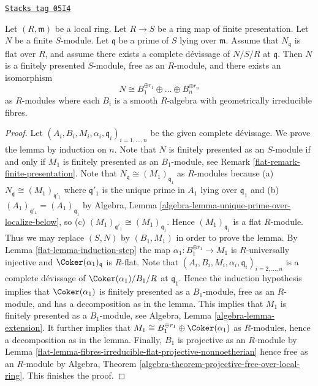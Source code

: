 \begin{lemma}
\label{flat-lemma-complete-devissage-flat-finite-type-module}
\href{https://stacks.math.columbia.edu/tag/05I4}{\texttt{Stacks tag 05I4}}

Let $(R, \mathfrak m)$ be a local ring.
Let $R \to S$ be a ring map of finite presentation.
Let $N$ be a finite $S$-module.
Let $\mathfrak q$ be a prime of $S$ lying over $\mathfrak m$.
Assume that $N_{\mathfrak q}$ is flat over $R$, and
assume there exists a complete d\'evissage of $N/S/R$ at $\mathfrak q$.
Then $N$ is a finitely presented $S$-module, free as an $R$-module,
and there exists an isomorphism
$$
N \cong B_1^{\oplus r_1} \oplus \ldots \oplus B_n^{\oplus r_n}
$$
as $R$-modules where each $B_i$ is a smooth $R$-algebra with geometrically
irreducible fibres.
\end{lemma}

\begin{proof}

Let $(A_i, B_i, M_i, \alpha_i, \mathfrak q_i)_{i = 1, \ldots, n}$
be the given complete d\'evissage. We prove the lemma by induction on $n$.
Note that $N$ is finitely presented as an $S$-module if and only if
$M_1$ is finitely presented as an $B_1$-module, see
Remark \ref{flat-remark-finite-presentation}.
Note that $N_{\mathfrak q} \cong (M_1)_{\mathfrak q_1}$ as $R$-modules
because (a) $N_{\mathfrak q} \cong (M_1)_{\mathfrak q'_1}$ where
$\mathfrak q'_1$ is the unique prime in $A_1$ lying over $\mathfrak q_1$
and (b) $(A_1)_{\mathfrak q'_1} = (A_1)_{\mathfrak q_1}$ by
Algebra, Lemma \ref{algebra-lemma-unique-prime-over-localize-below},
so (c) $(M_1)_{\mathfrak q'_1} \cong (M_1)_{\mathfrak q_1}$.
Hence $(M_1)_{\mathfrak q_1}$ is a flat $R$-module. Thus we may replace
$(S, N)$ by $(B_1, M_1)$ in order to prove the lemma. By
Lemma \ref{flat-lemma-induction-step}
the map $\alpha_1 : B_1^{\oplus r_1} \to M_1$ is $R$-universally injective
and $\Coker(\alpha_1)_{\mathfrak q}$ is $R$-flat.
Note that $(A_i, B_i, M_i, \alpha_i, \mathfrak q_i)_{i = 2, \ldots, n}$
is a complete d\'evissage of $\Coker(\alpha_1)/B_1/R$ at
$\mathfrak q_1$. Hence the induction hypothesis
implies that $\Coker(\alpha_1)$ is finitely presented as a
$B_1$-module, free as an $R$-module, and has a decomposition as in the lemma.
This implies that $M_1$ is finitely presented as a $B_1$-module, see
Algebra, Lemma \ref{algebra-lemma-extension}.
It further implies that
$M_1 \cong B_1^{\oplus r_1} \oplus \Coker(\alpha_1)$
as $R$-modules, hence a decomposition as in the lemma.
Finally, $B_1$ is projective as an $R$-module by
Lemma \ref{flat-lemma-fibres-irreducible-flat-projective-nonnoetherian}
hence free as an $R$-module by
Algebra, Theorem \ref{algebra-theorem-projective-free-over-local-ring}.
This finishes the proof.
\end{proof}

